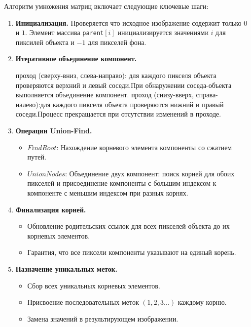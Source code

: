 \documentclass[12pt]{extarticle}
\begin{document}
\hspace*{1.25cm}Алгоритм умножения матриц включает следующие ключевые шаги:

\begin{enumerate}
    \item \textbf{Инициализация.} 
    Проверяется что исходное изображение содержит только $0$ и $1$. Элемент массива \texttt{parent$[i]$} инициализируется значениями $i$ для пиксилей объекта и $-1$ для пикселей фона.

    \item \textbf{Итеративное объединение компонент.} 
    \begin{itemize}
         проход (сверху-вниз, слева-направо): для каждого пикселя объекта проверяются верхний и левый соседи.При обнаружении соседа-объекта выполняется объединение компонент.
         проход (снизу-вверх, справа-налево):для каждого пикселя объекта проверяются нижний и правый соседи.Процесс прекращается при отсутствии изменений в проходе.
    \end{itemize}
 \item \textbf{Операции Union-Find.} 
    \begin{itemize}
        \item $FindRoot$: Нахождение корневого элемента компоненты со сжатием путей.
        \item $UnionNodes$: Объединение двух компонент: поиск корней для обоих пикселей и присоединение компоненты с большим индексом к компоненте с меньшим индексом при разных корнях.
    \end{itemize}

    \item \textbf{Финализация корней.} 
    \begin{itemize}
         \item Обновление родительских ссылок для всех пикселей объекта до их корневых элементов.
         \item Гарантия, что все пиксели компоненты указывают на единый корень.
    \end{itemize}
   \item \textbf{Назначение уникальных меток.}
   \begin{itemize}
   \item Сбор всех уникальных корневых элементов.
   \item Присвоение последовательных меток $(1, 2, 3...)$ каждому корню.
   \item Замена значений в результирующем изображении.
   \end{itemize}
\end{enumerate}
\end{document}
